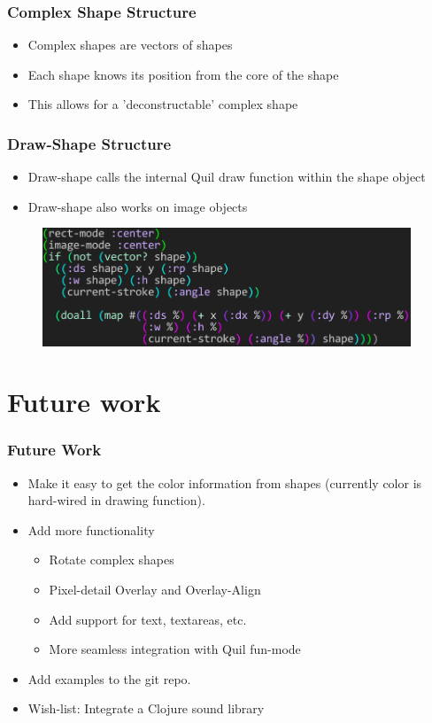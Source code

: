 \documentclass{beamer}
\begin{document}
\begin{frame}
\frametitle{Complex Shape Structure}
	\begin{itemize}
		\item Complex shapes are vectors of shapes
		\item Each shape knows its position from the core of the shape
		\item This allows for a 'deconstructable' complex shape
	\end{itemize}
\end{frame}

\begin{frame}
\frametitle{Draw-Shape Structure}
	\begin{itemize}
		\item Draw-shape calls the internal Quil draw function within the shape object
		\item Draw-shape also works on image objects
	\end{itemize}
	\begin{figure}
		\includegraphics[width=11cm]{PresentationImages/dsCode.png}
	\end{figure}
\end{frame}

\section{Future work}

\begin{frame}
	\frametitle{Future Work}
	\begin{itemize}
		\item Make it easy to get the color information from shapes (currently color is hard-wired in drawing function). 
		\item Add more functionality
		\begin{itemize}
			\item Rotate complex shapes
			\item Pixel-detail Overlay and Overlay-Align
			\item Add support for text, textareas, etc.  
			\item More seamless integration with Quil fun-mode
		\end{itemize}
		\item Add examples to the git repo. 
		\item Wish-list: Integrate a Clojure sound library
	\end{itemize}
\end{frame}
\end{document}
